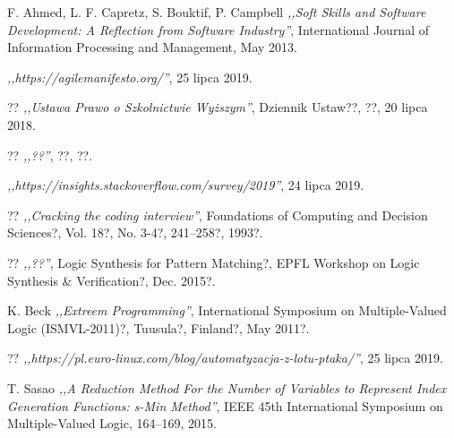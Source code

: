 
\begin{thebibliography}{99}


 F. Ahmed, L. F. Capretz, S. Bouktif, P. Campbell \emph{,,Soft Skills and Software Development: A Reflection from Software Industry''}, International Journal of Information Processing and Management, May 2013.

 \emph{,,https://agilemanifesto.org/''}, 25 lipca 2019.

 ?? \emph{,,Ustawa Prawo o Szkolnictwie Wyższym''}, Dziennik Ustaw??, ??, 20 lipca 2018.

 ??  \emph{,,??''}, ??, ??.

 \emph{,,https://insights.stackoverflow.com/survey/2019''}, 24 lipca 2019.

 ?? \emph{,,Cracking the coding interview''}, Foundations of Computing and Decision Sciences?, Vol. 18?, No. 3-4?, 241–258?, 1993?.

 ?? \emph{,,??''}, Logic Synthesis for Pattern Matching?, EPFL Workshop on Logic Synthesis \& Verification?, Dec. 2015?.

 K. Beck \emph{,,Extreem Programming''}, International Symposium on Multiple-Valued Logic (ISMVL-2011)?, Tuusula?, Finland?, May 2011?.

 ?? \emph{,,https://pl.euro-linux.com/blog/automatyzacja-z-lotu-ptaka/''}, 25 lipca 2019.

 T. Sasao \emph{,,A Reduction Method For the Number of Variables to Represent Index Generation Functions: s-Min Method''}, IEEE 45th International Symposium on Multiple-Valued Logic, 164–169, 2015.


\end{thebibliography}
